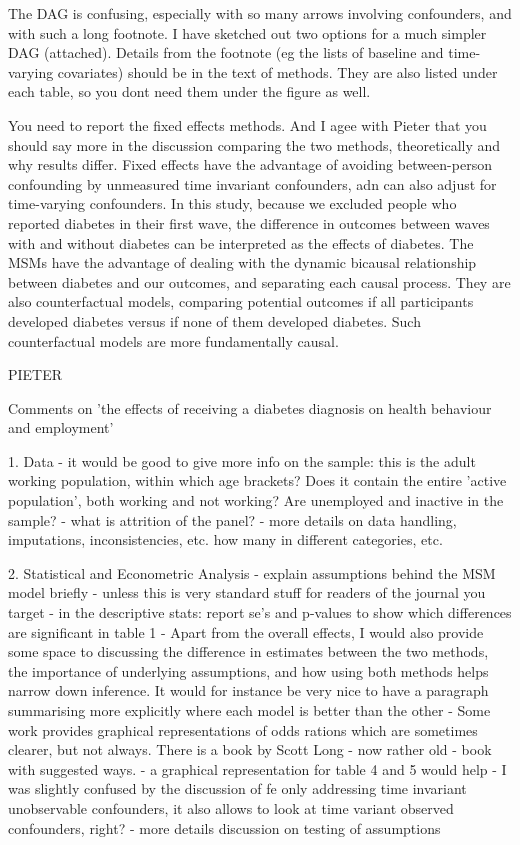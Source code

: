 The DAG is confusing, especially with so many arrows involving confounders, and with such a long footnote. I have sketched out two options for a much simpler DAG (attached). Details from the footnote (eg the lists of baseline and time-varying covariates) should be in the text of methods. They are also listed under each table, so you dont need them under the figure as well.
 
You need to report the fixed effects methods. And I agee with Pieter that you should say more in the discussion comparing the two methods, theoretically and why results differ. Fixed effects have the advantage of avoiding between-person confounding by unmeasured time invariant confounders, adn can also adjust for time-varying confounders.  In this study, because we excluded people who reported diabetes in their first wave, the difference in outcomes between waves with and without diabetes can be interpreted as the effects of diabetes. The MSMs have the advantage of dealing with the dynamic bicausal relationship between diabetes and our outcomes, and separating each causal process. They are also counterfactual models, comparing potential outcomes if all participants developed diabetes versus if none of them developed diabetes. Such counterfactual models are more fundamentally causal.

PIETER

Comments on 'the effects of receiving a diabetes diagnosis on health behaviour and employment'

1. Data
- it would be good to give more info on the sample: this is the adult working population, within which age brackets? Does it contain the entire 'active population', both working and not working?  Are unemployed and inactive in the sample?
- what is attrition of the panel?
- more details on data handling, imputations, inconsistencies, etc. how many in different categories, etc.

2. Statistical and Econometric Analysis
- explain assumptions behind the MSM model briefly - unless this is very standard stuff for readers of the journal you target
- in the descriptive stats: report se's and p-values to show  which differences are significant in table 1
- Apart from the overall effects, I would also provide some space to discussing the difference in estimates between the two methods, the importance of underlying assumptions, and how using both methods helps narrow down inference. It would for instance be very nice to have a paragraph summarising more explicitly where each model is better than the other
- Some work provides graphical representations of odds rations which are sometimes clearer, but not always.  There is a book by Scott Long - now rather old - book with suggested ways. 
- a  graphical representation for table 4 and 5 would help
- I was slightly confused by the discussion of fe only addressing time invariant unobservable confounders, it also allows to look at time variant observed confounders, right?
- more details discussion on testing of assumptions

